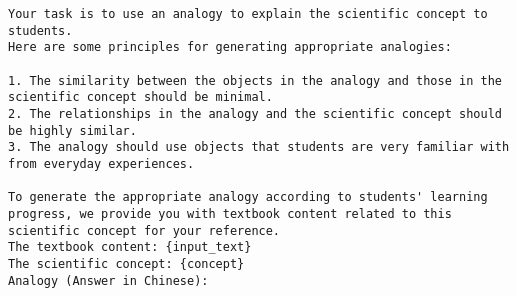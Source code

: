 
\begin{lstlisting}[caption={Prompt templates for GPT-4 to generate analogies.},label=lst:analogy_generation_prompt]
Your task is to use an analogy to explain the scientific concept to students. 
Here are some principles for generating appropriate analogies:

1. The similarity between the objects in the analogy and those in the scientific concept should be minimal.
2. The relationships in the analogy and the scientific concept should be highly similar.
3. The analogy should use objects that students are very familiar with from everyday experiences.

To generate the appropriate analogy according to students' learning progress, we provide you with textbook content related to this scientific concept for your reference.
The textbook content: {input_text}
The scientific concept: {concept}
Analogy (Answer in Chinese):
\end{lstlisting}